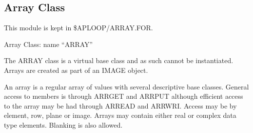 \subsection{Array Class}

   This module is kept in \$APLOOP/ARRAY.FOR.

   Array Class:  name ``ARRAY''

   The ARRAY class is a virtual base class and as such cannot be
instantiated.  Arrays are created as part of an IMAGE object.

An array is a regular array of values with several descriptive base
classes. General access to members is through ARRGET and ARRPUT
although efficient access to the array may be had through ARREAD and
ARRWRI.  Access may be by element, row, plane or image.  Arrays may
contain either real or complex data type elements.  Blanking is also
allowed.

